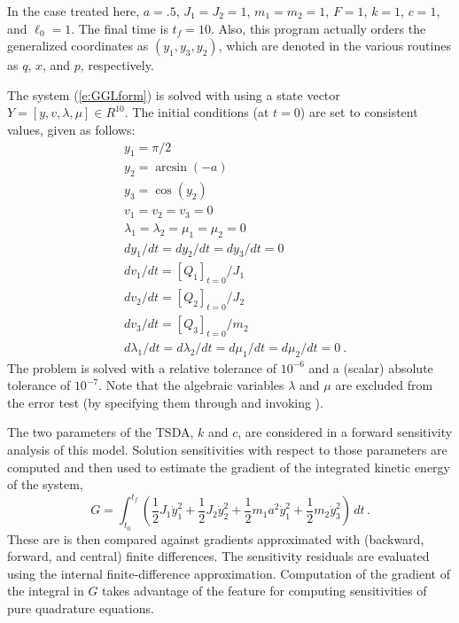 In the case treated here, $a = .5$, $J_1 = J_2 = 1$, $m_1 = m_2 = 1$,
$F = 1$, $k = 1$, $c = 1$, and $\ell_0 = 1$. The final time is $t_f = 10$.
Also, this program actually orders the generalized coordinates as $(y_1, y_3, y_2)$,
which are denoted in the various routines as $q$, $x$, and $p$, respectively.

The system (\ref{e:GGLform}) is solved with {\idas} using a state vector
$Y = [y, v, \lambda, \mu] \in R^{10}$.   The initial conditions (at $t = 0$)
are set to consistent values, given as follows:
\begin{equation*}
  \begin{split}
    &y_1 = \pi/2 \\
    &y_2 = \arcsin(-a) \\
    &y_3 = \cos(y_2) \\
    &v_1 = v_2 = v_3 = 0 \\
    &\lambda_1 = \lambda_2 = \mu_1 = \mu_2 = 0 \\
    &dy_1/dt = dy_2/dt = dy_3/dt = 0 \\
    &dv_1/dt = \left[Q_1\right]_{t=0} / J_1 \\
    &dv_2/dt = \left[Q_2\right]_{t=0} / J_2 \\
    &dv_3/dt = \left[Q_3\right]_{t=0} / m_2 \\
    &d\lambda_1/dt = d\lambda_2/dt = d\mu_1/dt = d\mu_2/dt = 0 ~.
  \end{split}
\end{equation*}
The problem is solved with a relative tolerance of $10^{-6}$ and a (scalar) absolute
tolerance of $10^{-7}$. Note that the algebraic variables $\lambda$ and $\mu$ are
excluded from the error test (by specifying them through  and invoking
).

The two parameters of the TSDA, $k$ and $c$, are considered in a forward
sensitivity analysis of this model. Solution sensitivities with respect
to those parameters are computed and then used to estimate the gradient
of the integrated kinetic energy of the system,
\begin{equation}
  G = \int_{t_0}^{t_f} \left(    
    \frac{1}{2} J_1 \dot y_1^2 + \frac{1}{2} J_2 \dot y_2^2 + \frac{1}{2} m_1 a^2 \dot y_1^2
          + \frac{1}{2} m_2 \dot y_3^2 \right) \, dt \, .
\end{equation}
These are is then compared against gradients approximated with (backward, forward, and central)
finite differences.  The sensitivity residuals are evaluated using the {\idas} internal
finite-difference approximation.  Computation of the gradient of the integral in $G$ takes
advantage of the {\idas} feature for computing sensitivities of pure quadrature equations.

